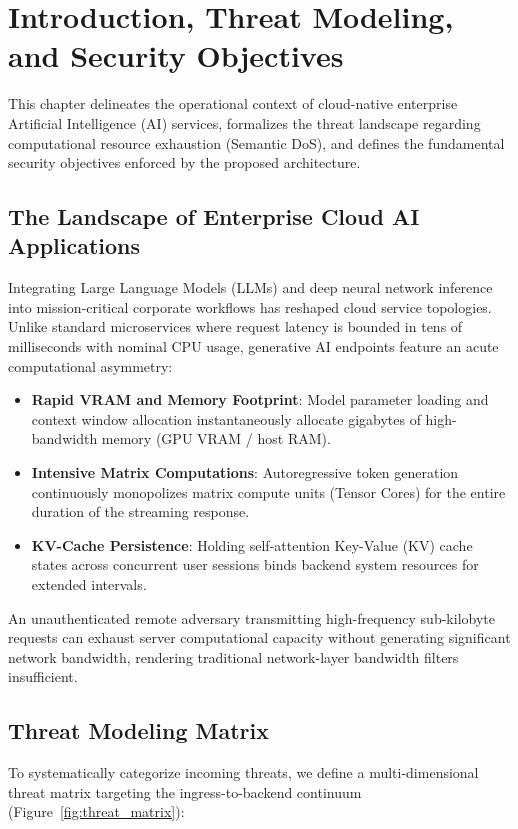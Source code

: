 \chapter{Introduction, Threat Modeling, and Security Objectives}
\label{chap:intro}

This chapter delineates the operational context of cloud-native enterprise Artificial Intelligence (AI) services, formalizes the threat landscape regarding computational resource exhaustion (Semantic DoS), and defines the fundamental security objectives enforced by the proposed architecture.

\section{The Landscape of Enterprise Cloud AI Applications}
Integrating Large Language Models (LLMs) and deep neural network inference into mission-critical corporate workflows has reshaped cloud service topologies. Unlike standard microservices where request latency is bounded in tens of milliseconds with nominal CPU usage, generative AI endpoints feature an acute computational asymmetry:
\begin{itemize}
    \item \textbf{Rapid VRAM and Memory Footprint}: Model parameter loading and context window allocation instantaneously allocate gigabytes of high-bandwidth memory (GPU VRAM / host RAM).
    \item \textbf{Intensive Matrix Computations}: Autoregressive token generation continuously monopolizes matrix compute units (Tensor Cores) for the entire duration of the streaming response.
    \item \textbf{KV-Cache Persistence}: Holding self-attention Key-Value (KV) cache states across concurrent user sessions binds backend system resources for extended intervals.
\end{itemize}

An unauthenticated remote adversary transmitting high-frequency sub-kilobyte requests can exhaust server computational capacity without generating significant network bandwidth, rendering traditional network-layer bandwidth filters insufficient.

\section{Threat Modeling Matrix}
To systematically categorize incoming threats, we define a multi-dimensional threat matrix targeting the ingress-to-backend continuum (Figure~\ref{fig:threat_matrix}):

